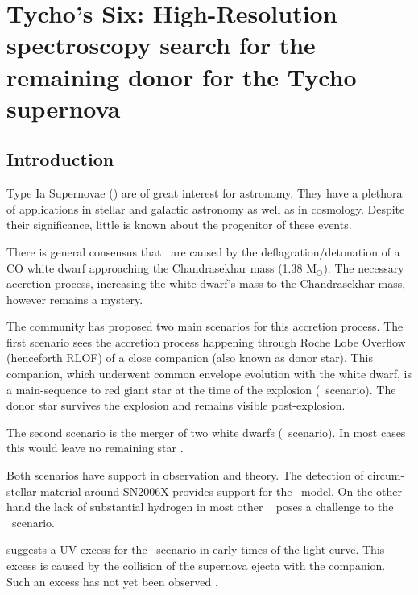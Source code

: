 \chapter{Tycho's Six: High-Resolution spectroscopy search for the remaining donor for the Tycho supernova}
\label{chap:sn1572_hires}


\section{Introduction}
\label{sec:introduction}


Type Ia Supernovae (\sneia) are of great interest for astronomy. They have a plethora of applications in stellar and galactic astronomy as well as in cosmology. Despite their significance, little is known about the progenitor of these events. 

There is general consensus that \sneia\ are caused by the deflagration/detonation of a CO white dwarf approaching the Chandrasekhar mass (1.38 M$_{\odot}$). The necessary accretion process, increasing the white dwarf's mass to the Chandrasekhar mass, however remains a mystery.

The community has proposed two main scenarios for this accretion process. The first scenario sees the accretion process happening through Roche Lobe Overflow (henceforth RLOF) of a close companion (also known as donor star). This companion, which underwent common envelope evolution with the white dwarf, is a main-sequence to red giant star at the time of the explosion (\sd\ scenario). The donor star survives the explosion and remains visible post-explosion.

The second scenario is the merger of two white dwarfs (\dd\ scenario). In most cases this would leave no remaining star \citep[e.g.][]{2010Natur.463...61P}.

Both scenarios have support in observation and theory. The detection of circum-stellar material around SN2006X \citep{2007Sci...317..924P} provides support for the \sd\ model. On the other hand the lack of substantial hydrogen in most other \sneia\ \citep{2007ApJ...670.1275L} poses a challenge to the \sd\ scenario.


\citet{2010ApJ...708.1025K} suggests a UV-excess for the \sd\ scenario in early times of the light curve. This excess is caused by the collision of the supernova ejecta with the companion. Such an excess has not yet been observed \citep{2010ApJ...722.1691H}. 


